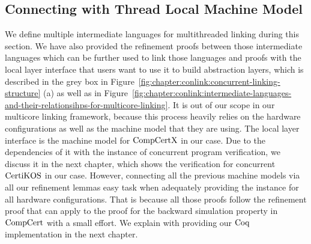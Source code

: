 \subsection{Connecting with Thread Local Machine Model}
\label{chapter:linking:subsec:connecting-with-thread-local-machine-model}


We define multiple intermediate languages for multithreaded linking during this section.
We have also provided the refinement proofs between those intermediate languages which can be further used to link those languages and proofs with the local layer interface that users want to use 
it to build abstraction layers, which is described in the grey box in Figure~\ref{fig:chapter:conlink:concurrent-linking-structure} (a) as well as in Figure~\ref{fig:chapter:conlink:intermediate-languages-and-their-relationsihps-for-multicore-linking}.
It is out of our scope in our multicore linking framework,
because this process heavily relies on the hardware configurations as well as the machine model that they are using. 
The local layer interface is the machine model for $\mathrm{CompCertX}$ in our case. 
Due to the dependencies of it with the instance of concurrent program verification, 
we discuss it in the next chapter, which shows the verification for concurrent $\mathrm{CertiKOS}$ in our case. 
However, connecting all the previous machine models via
all our refinement lemmas 
easy task when adequately providing the instance for all hardware configurations.
That is because all those proofs follow the refinement proof that can apply to the proof for the backward simulation property in $\mathrm{CompCert}$ with a small effort. 
We explain with providing our $\mathrm{Coq}$ implementation in the next chapter.




